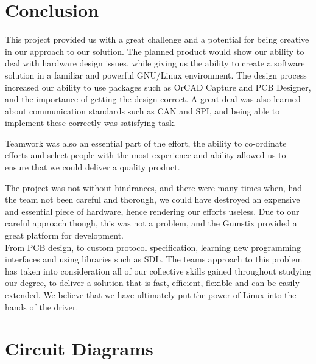 \documentclass[11pt]{report} %
\begin{document}
\chapter{Conclusion}
 This project provided us with a great challenge and a potential for being creative in our approach to our solution. 
 The planned product would show our ability to deal with hardware design issues, while giving us the 
 ability to create a software solution in a familiar and powerful GNU/Linux environment. The design process increased our
 ability to use packages such as OrCAD Capture and PCB Designer, and the importance of getting the design correct.
 A great deal was also learned about communication standards such as CAN and SPI, and being able to implement these
 correctly was satisfying task.
 
 Teamwork was also an essential part of the effort, the ability to co-ordinate efforts and select people with the most
 experience and ability allowed us to ensure that we could deliver a quality product.
 
 The project was not without hindrances, and there were many times when, had the team not been careful and 
 thorough, we could have destroyed an expensive and essential piece of hardware, hence rendering our efforts
 useless. Due to our careful approach though, this was not a problem, and the Gumstix provided a great platform
 for development.\\
 From PCB design, to custom protocol specification, learning new programming interfaces and using libraries such as SDL.
  The teams approach to this problem has taken into consideration all of our collective skills gained throughout
studying our degree, to deliver a solution that is fast, efficient, flexible and can be easily extended. We believe that 
we have 
ultimately put the power of Linux into the hands of the driver.

\appendix
\chapter{Circuit Diagrams}
\label{app:circuit_diagrams}
\end{document}
